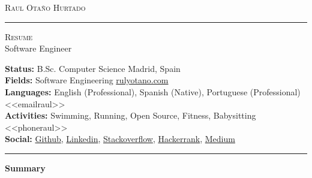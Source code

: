 \documentclass[10pt,A4]{article}
\newcommand{\cvsection}[1]
{
	\begin{center}
		\large\textcolor{sectcol}{\textbf{#1}}
	\end{center}
}
\newcommand{\metasection}[2]
{
\footnotesize{#2} \hspace*{\fill} \footnotesize{#1}\\[1pt]
}
\begin{document}



\vspace{-8pt}
\begin{center}
	\HUGE \textsc{Raul Otaño Hurtado} \textcolor{sectcol}{\rule[-1mm]{1mm}{0.9cm}} \textsc{Resume}\\[2pt]
	\small Software Engineer
\end{center}



\vspace{6pt}


\metasection{Madrid, Spain}{\textbf{Status:} B.Sc. Computer Science}
\metasection{\href{https://rulyotano.com}{rulyotano.com}}{\textbf{Fields:} Software Engineering} 
\metasection{<<emailraul>>}{\textbf{Languages:} English (Professional), Spanish (Native), Portuguese (Professional)}
\metasection{<<phoneraul>>}{\textbf{Activities:} Swimming, Running, Open Source, Fitness, Babysitting}
\metasection{}{\textbf{Social:} \href{https://github.com/rulyotano}{Github}, \href{https://www.linkedin.com/in/raulotanohurtado}{Linkedin}, \href{https://stackoverflow.com/users/1655482}{Stackoverflow}, \href{https://www.hackerrank.com/rulyotano}{Hackerrank}, \href{https://medium.com/@rulyotano}{Medium}}
\vspace{-2pt}
\textcolor{softcol}{\hrule}
\vspace{6pt}

\normalsize

\vspace{-6pt}
\cvsection{Summary}
\end{document}
